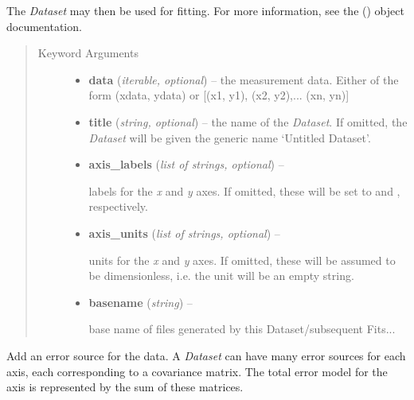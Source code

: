 \documentclass[a4paper,10pt,english]{sphinxmanual}
\begin{document}
\begin{fulllineitems}
The \emph{Dataset} may then be used for fitting. For more information, see the
{\hyperref[module_doc:kafe.fit.Fit]{\emph{}}} () object documentation.
\begin{quote}\begin{description}
\item[{Keyword Arguments}] \leavevmode\begin{itemize}
\item {} 
\textbf{data} (\emph{iterable, optional}) --
the measurement data. Either of the form (xdata, ydata) or
{[}(x1, y1), (x2, y2),... (xn, yn){]}

\item {} 
\textbf{title} (\emph{string, optional}) --
the name of the \emph{Dataset}. If omitted, the \emph{Dataset} will be given the
generic name `Untitled Dataset'.

\item {} 
\textbf{axis\_labels} (\emph{list of strings, optional}) --

labels for the \emph{x} and \emph{y} axes. If omitted, these will be set to
 and , respectively.

\item {} 
\textbf{axis\_units} (\emph{list of strings, optional}) --

units for the \emph{x} and \emph{y} axes. If omitted, these will be assumed to be
dimensionless, i.e. the unit will be an empty string.

\item {} 
\textbf{basename} (\emph{string}) --

base name of files generated by this Dataset/subsequent Fits...

\end{itemize}

\end{description}\end{quote}

\begin{fulllineitems}
\label{module_doc:kafe.dataset.Dataset.add_error_source}
Add an error source for the data. A \emph{Dataset} can have many
error sources for each axis, each corresponding to a covariance matrix.
The total error model for the axis is represented by the sum of
these matrices.


\end{fulllineitems}
\end{fulllineitems}
\end{document}
